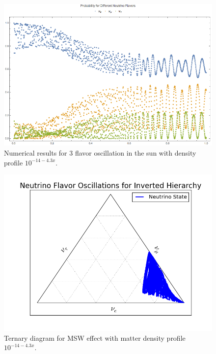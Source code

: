 \documentclass{tufte-handout}
\begin{document}
\begin{figure}
\centering
\includegraphics{assets/numericalMSW3Flavor-minus14matter.png}
\caption{Numerical results for 3 flavor oscillation in the sun with density profile $10^{-14 - 4.3 x}$.}
\label{fig:numericalMSW3Flavor-minus14matter}
\end{figure}



\begin{figure}
\centering
\includegraphics{assets/ternary/matter-minus14-1.png}
\caption{Ternary diagram for MSW effect with matter density profile $10^{-14 - 4.3 x}$.}
\label{fig:ternary-mass-1}
\end{figure}
\end{document}
